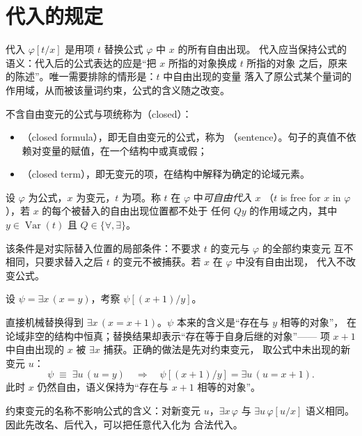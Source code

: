\section{代入的规定}\label{sec:subst}

代入 $\varphi[t/x]$ 是用项 $t$ 替换公式 $\varphi$ 中 $x$ 的所有自由出现。
代入应当保持公式的语义：代入后的公式表达的应是“把 $x$ 所指的对象换成 $t$ 所指的对象
之后，原来的陈述”。唯一需要排除的情形是：$t$ 中自由出现的变量
落入了原公式某个量词的作用域，从而被该量词约束，公式的含义随之改变。

不含自由变元的公式与项统称为（closed）：
\begin{itemize}[leftmargin=1.3em,itemsep=1pt]
  \item {}（closed formula），即无自由变元的公式，称为
        （sentence）。句子的真值不依赖对变量的赋值，在一个结构中或真或假；
  \item {}（closed term），即无变元的项，在结构中解释为确定的论域元素。
\end{itemize}

\begin{definition}[可自由代入]
设 $\varphi$ 为公式，$x$ 为变元，$t$ 为项。称 $t$ 在 $\varphi$ 中\emph{可自由代入} $x$
（$t$ is free for $x$ in $\varphi$），若 $x$ 的每个被替入的自由出现位置都不处于
任何 $Qy$ 的作用域之内，其中 $y\in\operatorname{Var}(t)$ 且 $Q\in\{\forall,\exists\}$。
\end{definition}

该条件是对实际替入位置的局部条件：不要求 $t$ 的变元与 $\varphi$ 的全部约束变元
互不相同，只要求替入之后 $t$ 的变元不被捕获。若 $x$ 在 $\varphi$ 中没有自由出现，
代入不改变公式。

\begin{example}[变量捕获]\label{ex:capture}
设 $\psi=\exists x\,(x=y)$，考察 $\psi[(x+1)/y]$。
\end{example}

直接机械替换得到 $\exists x\,(x=x+1)$。$\psi$ 本来的含义是“存在与 $y$ 相等的对象”，
在论域非空的结构中恒真；替换结果却表示“存在等于自身后继的对象”——
项 $x+1$ 中自由出现的 $x$ 被 $\exists x$ 捕获。正确的做法是先对约束变元，
取公式中未出现的新变元 $u$：
\[
  \psi \;\equiv\; \exists u\,(u=y)
  \quad\Longrightarrow\quad
  \psi[(x+1)/y]=\exists u\,(u=x+1).
\]
此时 $x$ 仍然自由，语义保持为“存在与 $x+1$ 相等的对象”。

\begin{remark}
约束变元的名称不影响公式的含义：对新变元 $u$，$\exists x\,\varphi$ 与
$\exists u\,\varphi[u/x]$ 语义相同。因此先改名、后代入，可以把任意代入化为
合法代入。
\end{remark}
